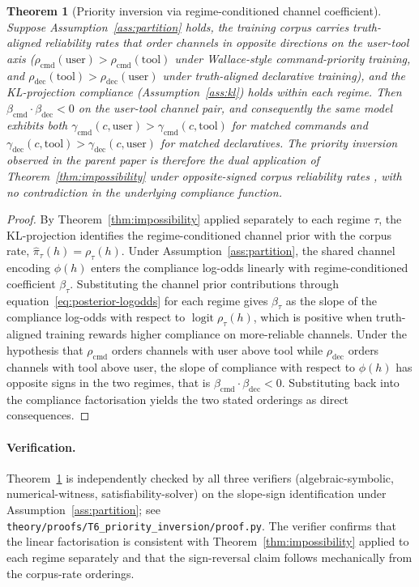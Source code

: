 \documentclass[11pt]{article}
\newtheorem{theorem}{Theorem}
\theoremstyle{definition}
\theoremstyle{remark}
\begin{document}
\begin{theorem}[Priority inversion via regime-conditioned channel coefficient]
\label{thm:priority-inversion}
Suppose Assumption~\ref{ass:partition} holds, the training corpus carries
truth-aligned reliability rates that order channels in opposite directions on the
user-tool axis ($\rho_{\text{cmd}}(\text{user}) > \rho_{\text{cmd}}(\text{tool})$
under Wallace-style command-priority training, and
$\rho_{\text{dec}}(\text{tool}) > \rho_{\text{dec}}(\text{user})$ under
truth-aligned declarative training), and the KL-projection compliance
\textnormal{(Assumption~\ref{ass:kl})} holds within each regime. Then
$\beta_{\text{cmd}} \cdot \beta_{\text{dec}} < 0$ on the user-tool channel pair,
and consequently the same model exhibits both
$\gamma_{\text{cmd}}(c, \text{user}) > \gamma_{\text{cmd}}(c, \text{tool})$ for
matched commands and
$\gamma_{\text{dec}}(c, \text{tool}) > \gamma_{\text{dec}}(c, \text{user})$ for
matched declaratives. The priority inversion observed in the parent paper is
therefore the dual application of Theorem~\ref{thm:impossibility} under
opposite-signed corpus reliability rates , with no contradiction in the
underlying compliance function.
\end{theorem}

\begin{proof}
By Theorem~\ref{thm:impossibility} applied separately to each regime $\tau$, the
KL-projection identifies the regime-conditioned channel prior with the corpus rate,
$\hat\pi_\tau(h) = \rho_\tau(h)$. Under Assumption~\ref{ass:partition}, the
shared channel encoding $\phi(h)$ enters the compliance log-odds linearly with
regime-conditioned coefficient $\beta_\tau$. Substituting the channel prior
contributions through equation~\eqref{eq:posterior-logodds} for each regime gives
$\beta_\tau$ as the slope of the compliance log-odds with respect to
$\operatorname{logit} \rho_\tau(h)$, which is positive when truth-aligned training
rewards higher compliance on more-reliable channels. Under the hypothesis that
$\rho_{\text{cmd}}$ orders channels with user above tool while $\rho_{\text{dec}}$
orders channels with tool above user, the slope of compliance with respect to
$\phi(h)$ has opposite signs in the two regimes, that is
$\beta_{\text{cmd}} \cdot \beta_{\text{dec}} < 0$. Substituting back into the
compliance factorisation yields the two stated orderings as direct consequences.
\end{proof}

\paragraph{Verification.} Theorem~\ref{thm:priority-inversion} is independently checked
by all three verifiers (algebraic-symbolic, numerical-witness, satisfiability-solver) on the slope-sign
identification under Assumption~\ref{ass:partition}; see
\texttt{theory/proofs/T6\_priority\_inversion/proof.py}. The verifier confirms
that the linear factorisation is consistent with Theorem~\ref{thm:impossibility}
applied to each regime separately and that the sign-reversal claim follows
mechanically from the corpus-rate orderings.
\end{document}
